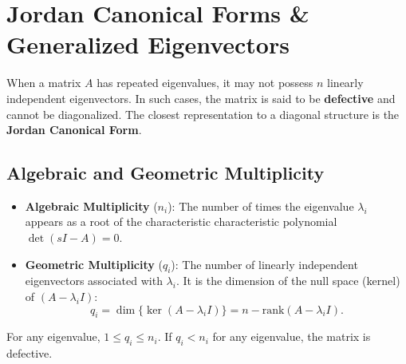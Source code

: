 \section{Jordan Canonical Forms \& Generalized Eigenvectors}
When a matrix $A$ has repeated eigenvalues, it may not possess $n$ linearly independent eigenvectors. In such cases, the matrix is said to be \textbf{defective} and cannot be diagonalized. The closest representation to a diagonal structure is the \textbf{Jordan Canonical Form}.

\subsection{Algebraic and Geometric Multiplicity}
\begin{itemize}
    \item \textbf{Algebraic Multiplicity} ($n_i$): The number of times the eigenvalue $\lambda_i$ appears as a root of the characteristic characteristic polynomial $\det(sI - A) = 0$.
    \item \textbf{Geometric Multiplicity} ($q_i$): The number of linearly independent eigenvectors associated with $\lambda_i$. It is the dimension of the null space (kernel) of $(A - \lambda_i I)$:
    \begin{equation}
q_i = \dim \{ \ker(A - \lambda_i I) \} = n - \text{rank}(A - \lambda_i I) .
    \end{equation}
\end{itemize}
For any eigenvalue, $1 \le q_i \le n_i$. If $q_i < n_i$ for any eigenvalue, the matrix is defective.

